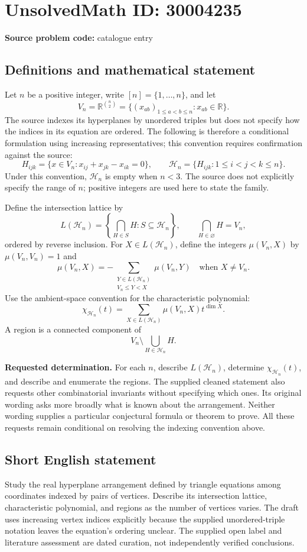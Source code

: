 \documentclass[11pt]{article}
\newcommand{\R}{\mathbb{R}}
\begin{document}
\section*{UnsolvedMath ID: 30004235}
\textbf{Source problem code:} catalogue entry
\subsection{Definitions and mathematical statement}
Let \(n\) be a positive integer, write \([n]=\{1,\ldots,n\}\), and let
\[
V_n=\R^{\binom n2}=\{(x_{ab})_{1\leq a<b\leq n}:x_{ab}\in\R\}.
\]
The source indexes its hyperplanes by unordered triples but does not specify how the indices in its equation are ordered. The following is therefore a conditional formulation using increasing representatives; this convention requires confirmation against the source:
\[
H_{ijk}=\{x\in V_n:x_{ij}+x_{jk}-x_{ik}=0\},\qquad
\mathcal H_n=\{H_{ijk}:1\leq i<j<k\leq n\}.
\]
Under this convention, \(\mathcal H_n\) is empty when \(n<3\). The source does not explicitly specify the range of \(n\); positive integers are used here to state the family.

Define the intersection lattice by
\[
L(\mathcal H_n)=\left\{\bigcap_{H\in S}H:S\subseteq\mathcal H_n\right\},
\qquad \bigcap_{H\in\varnothing}H=V_n,
\]
ordered by reverse inclusion. For \(X\in L(\mathcal H_n)\), define the integers \(\mu(V_n,X)\) by \(\mu(V_n,V_n)=1\) and
\[
\mu(V_n,X)=-\sum_{\substack{Y\in L(\mathcal H_n)\\ V_n\leq Y<X}}\mu(V_n,Y)
\quad\text{when }X\ne V_n.
\]
Use the ambient-space convention for the characteristic polynomial:
\[
\chi_{\mathcal H_n}(t)=\sum_{X\in L(\mathcal H_n)}\mu(V_n,X)t^{\dim X}.
\]
A region is a connected component of
\[
V_n\setminus\bigcup_{H\in\mathcal H_n}H.
\]

\textbf{Requested determination.} For each \(n\), describe \(L(\mathcal H_n)\), determine \(\chi_{\mathcal H_n}(t)\), and describe and enumerate the regions. The supplied cleaned statement also requests other combinatorial invariants without specifying which ones. Its original wording asks more broadly what is known about the arrangement. Neither wording supplies a particular conjectural formula or theorem to prove. All these requests remain conditional on resolving the indexing convention above.
\subsection{Short English statement}
Study the real hyperplane arrangement defined by triangle equations among coordinates indexed by pairs of vertices. Describe its intersection lattice, characteristic polynomial, and regions as the number of vertices varies. The draft uses increasing vertex indices explicitly because the supplied unordered-triple notation leaves the equation's ordering unclear. The supplied open label and literature assessment are dated curation, not independently verified conclusions.
\end{document}
